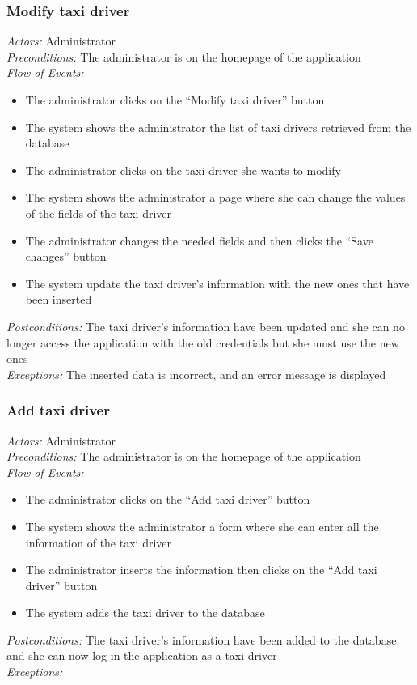 \documentclass{article}
\begin{document}
\subsubsection{Modify taxi driver}
\textit{Actors:} Administrator
\\\textit{Preconditions:} The administrator is on the homepage of the application
\\\textit{Flow of Events:}
\begin{itemize}
	\item  The administrator clicks on the ``Modify taxi driver'' button
	\item  The system shows the administrator the list of taxi drivers retrieved from the database
	\item  The administrator clicks on the taxi driver she wants to modify
	\item  The system shows the administrator a page where she can change the values of the fields of the taxi driver
	\item  The administrator changes the needed fields and then clicks the ``Save changes'' button
	\item  The system update the taxi driver's information with the new ones that have been inserted
\end{itemize}
\textit{Postconditions:} The taxi driver's information have been updated and she can no longer access the application with the old credentials but she must use the new ones
\\\textit{Exceptions:} The inserted data is incorrect, and an error message is displayed 

\subsubsection{Add taxi driver}
\textit{Actors:} Administrator
\\\textit{Preconditions:} The administrator is on the homepage of the application
\\\textit{Flow of Events:}
\begin{itemize}
	\item  The administrator clicks on the ``Add taxi driver'' button
	\item  The system shows the administrator a form where she can enter all the information of the taxi driver %
	\item  The administrator inserts the information then clicks on the ``Add taxi driver'' button
	\item  The system adds the taxi driver to the database
\end{itemize}
\textit{Postconditions:} The taxi driver's information have been added to the database and she can now log in the application as a taxi driver
\\\textit{Exceptions:}
\end{document}
